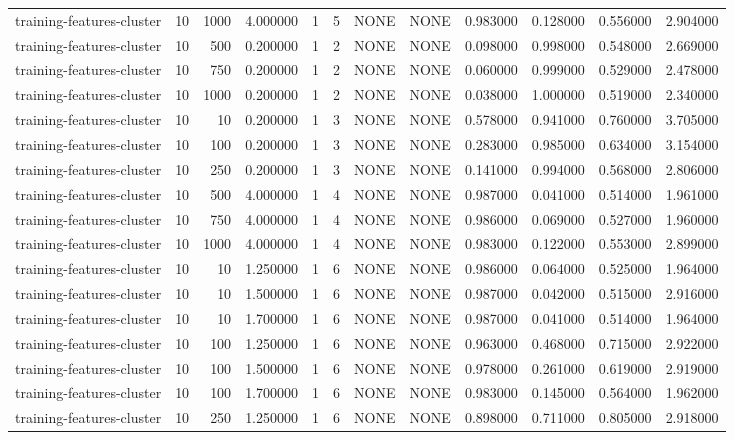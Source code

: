 \begin{tabular}{lrrrllllrrrr}
training-features-cluster & 10 & 1000 & 4.000000 & 1 & 5 & NONE & NONE & 0.983000 & 0.128000 & 0.556000 & 2.904000 \\
training-features-cluster & 10 & 500 & 0.200000 & 1 & 2 & NONE & NONE & 0.098000 & 0.998000 & 0.548000 & 2.669000 \\
training-features-cluster & 10 & 750 & 0.200000 & 1 & 2 & NONE & NONE & 0.060000 & 0.999000 & 0.529000 & 2.478000 \\
training-features-cluster & 10 & 1000 & 0.200000 & 1 & 2 & NONE & NONE & 0.038000 & 1.000000 & 0.519000 & 2.340000 \\
training-features-cluster & 10 & 10 & 0.200000 & 1 & 3 & NONE & NONE & 0.578000 & 0.941000 & 0.760000 & 3.705000 \\
training-features-cluster & 10 & 100 & 0.200000 & 1 & 3 & NONE & NONE & 0.283000 & 0.985000 & 0.634000 & 3.154000 \\
training-features-cluster & 10 & 250 & 0.200000 & 1 & 3 & NONE & NONE & 0.141000 & 0.994000 & 0.568000 & 2.806000 \\
training-features-cluster & 10 & 500 & 4.000000 & 1 & 4 & NONE & NONE & 0.987000 & 0.041000 & 0.514000 & 1.961000 \\
training-features-cluster & 10 & 750 & 4.000000 & 1 & 4 & NONE & NONE & 0.986000 & 0.069000 & 0.527000 & 1.960000 \\
training-features-cluster & 10 & 1000 & 4.000000 & 1 & 4 & NONE & NONE & 0.983000 & 0.122000 & 0.553000 & 2.899000 \\
training-features-cluster & 10 & 10 & 1.250000 & 1 & 6 & NONE & NONE & 0.986000 & 0.064000 & 0.525000 & 1.964000 \\
training-features-cluster & 10 & 10 & 1.500000 & 1 & 6 & NONE & NONE & 0.987000 & 0.042000 & 0.515000 & 2.916000 \\
training-features-cluster & 10 & 10 & 1.700000 & 1 & 6 & NONE & NONE & 0.987000 & 0.041000 & 0.514000 & 1.964000 \\
training-features-cluster & 10 & 100 & 1.250000 & 1 & 6 & NONE & NONE & 0.963000 & 0.468000 & 0.715000 & 2.922000 \\
training-features-cluster & 10 & 100 & 1.500000 & 1 & 6 & NONE & NONE & 0.978000 & 0.261000 & 0.619000 & 2.919000 \\
training-features-cluster & 10 & 100 & 1.700000 & 1 & 6 & NONE & NONE & 0.983000 & 0.145000 & 0.564000 & 1.962000 \\
training-features-cluster & 10 & 250 & 1.250000 & 1 & 6 & NONE & NONE & 0.898000 & 0.711000 & 0.805000 & 2.918000 \\

\end{tabular}
